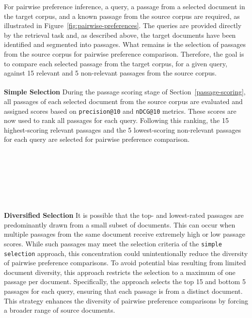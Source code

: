 For pairwise preference inference, a query, a passage from a selected document in the target corpus, and a known passage from the source corpus are required, as illustrated in Figure~\ref{fig:pairwise-preferences}. The queries are provided directly by the retrieval task and, as described above, the target documents have been identified and segmented into passages. What remains is the selection of passages from the source corpus for pairwise preference comparison. Therefore, the goal is to compare each selected passage from the target corpus, for a given query, against 15 relevant and 5 non-relevant passages from the source corpus.
\\\\
\textbf{Simple Selection} During the passage scoring stage of Section~\ref{passage-scoring}, all passages of each selected document from the source corpus are evaluated and assigned scores based on \texttt{precision@10} and \texttt{nDCG@10} metrics. These scores are now used to rank all passages for each query. Following this ranking, the 15 highest-scoring relevant passages and the 5 lowest-scoring non-relevant passages for each query are selected for pairwise preference comparison.
\\\\\\\\\\\\\\\\
\textbf{Diversified Selection} It is possible that the top- and lowest-rated passages are predominantly drawn from a small subset of documents. This can occur when multiple passages from the same document receive extremely high or low passage scores. While such passages may meet the selection criteria of the \texttt{simple selection} approach, this concentration could unintentionally reduce the diversity of pairwise preference comparisons. To avoid potential bias resulting from limited document diversity, this approach restricts the selection to a maximum of one passage per document. Specifically, the approach selects the top 15 and bottom 5 passages for each query, ensuring that each passage is from a distinct document. This strategy enhances the diversity of pairwise preference comparisons by forcing a broader range of source documents.
